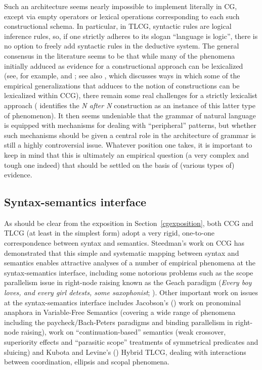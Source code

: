 \documentclass[output=paper
                ,modfonts
                ,nonflat
	        ,collection
	        ,collectionchapter
	        ,collectiontoclongg
 	        ,biblatex
                ,babelshorthands
                ,newtxmath
                ,draftmode
                ,colorlinks, citecolor=brown
]{./langsci/langscibook}
\begin{document}
Such an architecture seems nearly impossible to implement literally in
CG, except via empty operators or lexical operations corresponding to
each such constructional schema. In particular, in TLCG, syntactic
rules are logical inference rules, so, if one strictly adheres to its
slogan ``language is logic'', there is no option to freely add
syntactic rules in the deductive system. The general consensus in the
literature seems to be that while many of the phenomena initially
adduced as evidence for a constructional approach can be lexicalized
(see, for example, \citealt{MWArgSt} and ; see also
\citealt{steedman2011ccg}, which discusses ways in which some of the
empirical generalizations that \citealt{Goldberg95a} adduces to the
notion of constructions can be lexicalized within CCG), there remain
some real challenges for a strictly lexicalist approach
( identifies the \textit{N after N}
construction as an instance of this latter type of phenomenon). It
then seems undeniable that the grammar of natural language is equipped with
mechanisms for dealing with ``peripheral'' patterns, but whether such
mechanisms should be given a central role in the architecture of
grammar is still a highly controversial issue. Whatever position one
takes, it is important to keep in mind that this is ultimately an
empirical question (a very complex and tough one indeed) that
should be settled on the basis of (various types of) evidence.



\subsection{Syntax-semantics interface }

As should be clear from the exposition in Section~\ref{cgexposition},
both CCG and TLCG (at 
least in the simplest form) adopt a very rigid, one-to-one
correspondence between syntax and semantics. Steedman's work on CCG
has demonstrated that 
this simple and systematic mapping between syntax and semantics
enables attractive analyses of
a number of empirical phenomena at the syntax-semantics interface,
including some notorious problems such as the scope parallelism issue
in right-node raising known as
the Geach paradigm (\textit{Every boy loves, and
every girl detests, some saxophonist}; \citealt{Geach70a}). Other important work on issues
at the syntax-semantics interface includes Jacobson's
(\citeyear{jacobson1999a,jacobson2000a}) work on pronominal anaphora
in Variable-Free Semantics (covering a wide range of phenomena
including the paycheck/Bach-Peters paradigms and binding parallelism
in right-node raising),  work on ``continuation-based''
semantics (weak crossover, superiority effects and ``parasitic scope''
treatments of symmetrical predicates and sluicing) and Kubota and
Levine's
(\citeyear{kubota-levine-coord,kubota-levine-pseudo,KubotaLevineBook})
Hybrid TLCG, dealing with interactions between coordination, ellipsis and scopal
phenomena.
\end{document}
